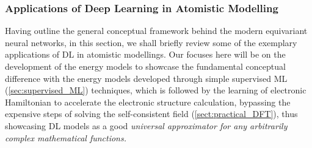 \subsubsection{Applications of Deep Learning in Atomistic Modelling}
\label{sec:DL_applications}

Having outline the general conceptual framework behind the modern equivariant neural networks, in this section, we shall briefly review some of the exemplary applications of DL in atomistic modellings. Our focuses here will be  on the development of the energy models to showcase the fundamental conceptual difference with the energy models  developed through simple supervised ML (\cref{sec:supervised_ML}) techniques, which is followed by the learning of electronic Hamiltonian to accelerate the electronic structure calculation, bypassing the expensive steps of solving the self-consistent field (\cref{sect:practical_DFT}), thus showcasing DL models as a good \emph{universal approximator for any arbitrarily complex mathematical functions.}\cite{Hermann2020-ao}

